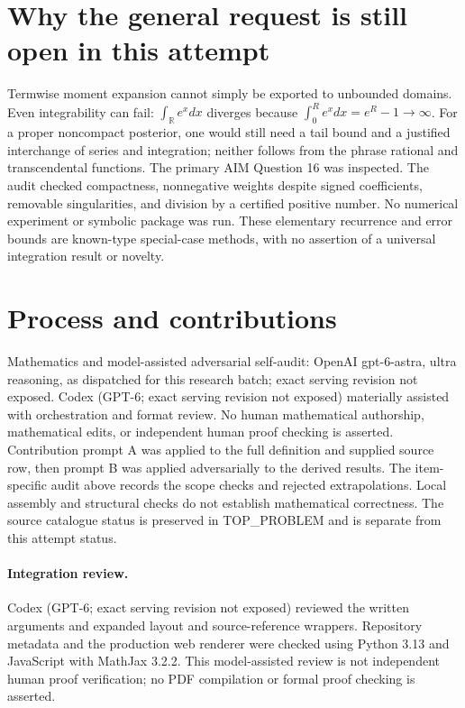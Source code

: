 \documentclass[11pt]{article}
\begin{document}
\section{Why the general request is still open in this attempt}
Termwise moment expansion cannot simply be exported to unbounded domains.
Even integrability can fail: $\int_{\mathbb R}e^x dx$ diverges because
$\int_0^R e^x dx=e^R-1\to\infty$. For a proper noncompact posterior,
one would still need a tail bound and a justified interchange of series
and integration; neither follows from the phrase rational and
transcendental functions. The primary AIM Question 16 was inspected.
The audit checked compactness, nonnegative weights despite signed
coefficients, removable singularities, and division by a certified
positive number. No numerical experiment or symbolic package was run.
These elementary recurrence and error bounds are known-type special-case
methods, with no assertion of a universal integration result or novelty.

\section{Process and contributions}
Mathematics and model-assisted adversarial self-audit: OpenAI gpt-6-astra, ultra reasoning, as dispatched for this research batch; exact serving revision not exposed. Codex (GPT-6; exact serving revision not exposed) materially assisted with orchestration and format review. No human mathematical authorship, mathematical edits, or independent human proof checking is asserted.
Contribution prompt A was applied to the full definition and supplied source row, then prompt B was applied adversarially to the derived results. The item-specific audit above records the scope checks and rejected extrapolations. Local assembly and structural checks do not establish mathematical correctness. The source catalogue status is preserved in TOP\_PROBLEM and is separate from this attempt status.
\paragraph{Integration review.} Codex (GPT-6; exact serving revision not exposed) reviewed the written arguments and expanded layout and source-reference wrappers. Repository metadata and the production web renderer were checked using Python 3.13 and JavaScript with MathJax 3.2.2. This model-assisted review is not independent human proof verification; no PDF compilation or formal proof checking is asserted.
\end{document}
